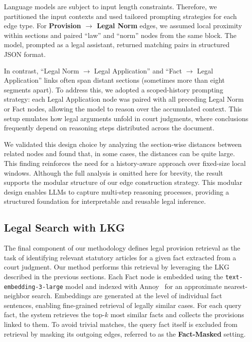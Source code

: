 \documentclass[11pt]{article}
\begin{document}
Language models are subject to input length constraints. Therefore, we partitioned the input contexts and used tailored prompting strategies for each edge type. For \textbf{Provision $\rightarrow$ Legal Norm} edges, we assumed local proximity within sections and paired ``law'' and ``norm'' nodes from the same block. The model, prompted as a legal assistant, returned matching pairs in structured JSON format.




In contrast, ``Legal Norm $\rightarrow$ Legal Application'' and ``Fact $\rightarrow$ Legal Application'' links often span distant sections (sometimes more than eight segments apart). To address this, we adopted a scoped-history prompting strategy: each Legal Application node was paired with all preceding Legal Norm or Fact nodes, allowing the model to reason over the accumulated context. This setup emulates how legal arguments unfold in court judgments, where conclusions frequently depend on reasoning steps distributed across the document.


We validated this design choice by analyzing the section-wise distances between related nodes and found that, in some cases, the distances can be quite large. This finding reinforces the need for a history-aware approach over fixed-size local windows. Although the full analysis is omitted here for brevity, the result supports the modular structure of our edge construction strategy. This modular design enables LLMs to capture multi-step reasoning processes, providing a structured foundation for interpretable and reusable legal inference.


\subsection{Legal Search with LKG}
\label{sec:legal-search}


The final component of our methodology defines legal provision retrieval as the task of identifying relevant statutory articles for a given fact extracted from a court judgment. Our method performs this retrieval by leveraging the LKG described in the previous sections. Each Fact node is embedded using the \texttt{text-embedding-3-large} model and indexed with Annoy~\cite{annoy-github} for an approximate nearest-neighbor search. Embeddings are generated at the level of individual fact sentences, enabling fine-grained retrieval of legally similar cases. For each query fact, the system retrieves the top-$k$ most similar facts and collects the provisions linked to them. To avoid trivial matches, the query fact itself is excluded from retrieval by masking its outgoing edges, referred to as the \textbf{Fact-Masked} setting.
\end{document}
